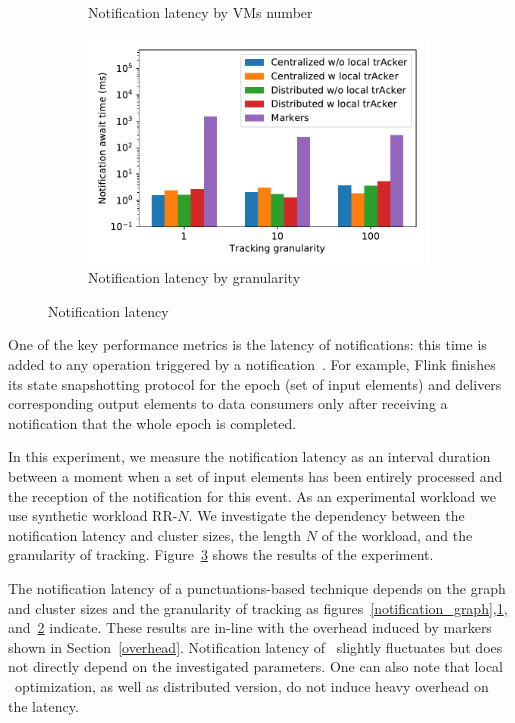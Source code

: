 \begin{figure}[t!]
\begin{subfigure}[b]{0.32\textwidth}
            \caption{Notification latency by VMs number}
            \label{notification_machines}
    \end{subfigure}
    \hspace{5mm}
    \begin{subfigure}[b]{0.32\textwidth}
            \includegraphics[width=0.99\textwidth]{pics/notification_await_time_by_tracking_frequency_bars.pdf}
            \caption{Notification latency by granularity}
            \label{notification_granularity}
    \end{subfigure}
    \caption{Notification latency}
    \label{notification_latency}
\end{figure}

One of the key performance metrics is the latency of notifications: this time is added to any operation triggered by a notification~\cite{Carbone:2017:SMA:3137765.3137777, we2018adbis}. For example, Flink finishes its state snapshotting protocol for the epoch (set of input elements) and delivers corresponding output elements to data consumers only after receiving a notification that the whole epoch is completed. 

In this experiment, we measure the notification latency as an interval duration between a moment when a set of input elements has been entirely processed and the reception of the notification for this event. As an experimental workload we use synthetic workload RR-$N$. We investigate the dependency between the notification latency and cluster sizes, the length $N$ of the workload, and the granularity of tracking. Figure~\ref{notification_latency} shows the results of the experiment. 

The notification latency of a punctuations-based technique depends on the graph and cluster sizes and the granularity of tracking as figures~\ref{notification_graph},\ref{notification_machines}, and~\ref{notification_granularity} indicate. These results are in-line with the overhead induced by markers shown in Section~\ref{overhead}. Notification latency of \tracker\ slightly fluctuates but does not directly depend on the investigated parameters. One can also note that local \tracker\ optimization, as well as distributed version, do not induce heavy overhead on the latency.


